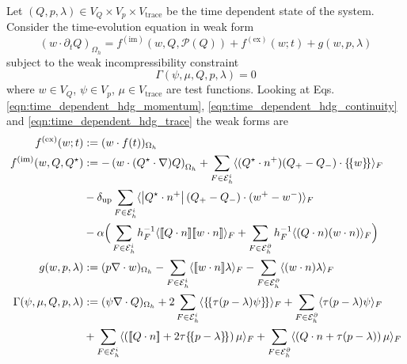 \documentclass[11pt]{article}
\newcommand{\jump}[1]{[\![ #1]\!]}
\newcommand{\avg}[1]{\{\!\{#1\}\!\}}
\newcommand{\impl}{{(\text{im})}}
\newcommand{\expl}{{(\text{ex})}}
\begin{document}
Let $(Q,p,\lambda)\in V_Q\times V_p\times V_{\text{trace}}$ be the time dependent state of the system. Consider the time-evolution equation in weak form
\begin{equation}
    (w\cdot \partial_t Q)_{\Omega_h} = f^\impl(w,Q,\mathcal{P}(Q))  + f^\expl(w;t) + g(w,p,\lambda)\label{eqn:time_evolution}
\end{equation}
subject to the weak incompressibility constraint
\begin{equation}
    \Gamma(\psi,\mu,Q,p,\lambda) = 0\label{eqn:constraint}
\end{equation}
where $w\in V_Q$, $\psi\in V_p$, $\mu\in V_{\text{trace}}$ are test functions. Looking at Eqs. \eqref{eqn:time_dependent_hdg_momentum}, \eqref{eqn:time_dependent_hdg_continuity} and \eqref{eqn:time_dependent_hdg_trace} the weak forms are
\begin{subequations}
    \begin{align}
        f^\expl(w;t)                 & := (w\cdot f(t))_{\Omega_h}                                                                                                                                                                                                                                    \\
        f^\impl(w,Q,Q^\star)         & := -\left(w\cdot (Q^\star\cdot \nabla) Q\right)_{\Omega_h}  +\sum_{F\in\mathcal{E}_h^i} \langle (Q^\star \cdot n^+)(Q_+ - Q_-)\cdot \avg{w}\rangle_F               \notag                                                                                      \\
                                     & -\delta_{\text{up}}\sum_{F\in\mathcal{E}_h^i} \langle \left|Q^\star \cdot n^+\right|(Q_+ - Q_-)\cdot (w^+-w^-)\rangle_F  \label{eqn:imex_fimpl}                                                                                                                \\
                                     & - \alpha \Big(\sum_{F\in\mathcal{E}_h^i} h_F^{-1}\langle \jump{Q\cdot n} \jump{w\cdot n}\rangle_F                                      +  \sum_{F\in\mathcal{E}_h^\partial} h_F^{-1}\langle (Q\cdot n) (w\cdot n)\rangle_F \Big)                 \notag        \\
        g(w,p,\lambda)               & := (p \nabla\cdot w)_{\Omega_h} -  \sum_{F\in\mathcal{E}_h^i} \langle \jump{w\cdot n}\lambda\rangle_{F}  -  \sum_{F\in\mathcal{E}_h^\partial} \langle (w\cdot n)\lambda\rangle_{F}      \label{eqn:imex_pressure_gradient}                                     \\
        \Gamma(\psi,\mu,Q,p,\lambda) & := (\psi \nabla\cdot Q)_{\Omega_h} + 2 \sum_{F\in\mathcal{E}_h^i} \langle \avg{\tau (p-\lambda)\psi}\rangle_{F}            + \sum_{F\in\mathcal{E}_h^\partial} \langle \tau (p-\lambda)\psi\rangle_{F}                      \label{eqn:imex_incompressibility} \\
                                     & +\sum_{F\in\mathcal{E}_h^i} \langle \left(\jump{Q\cdot n}+2\tau \avg{p-\lambda}\right)\mu \rangle_{F} + \sum_{F\in\mathcal{E}_h^\partial} \langle \left(Q\cdot n+\tau (p-\lambda)\right)\mu \rangle_{F}\notag
    \end{align}
\end{subequations}
\end{document}
